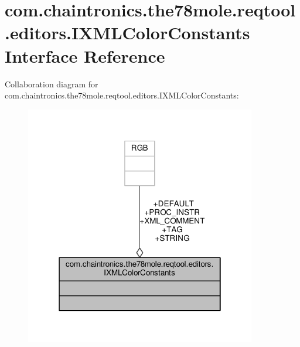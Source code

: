 \hypertarget{interfacecom_1_1chaintronics_1_1the78mole_1_1reqtool_1_1editors_1_1IXMLColorConstants}{}\section{com.\+chaintronics.\+the78mole.\+reqtool.\+editors.\+I\+X\+M\+L\+Color\+Constants Interface Reference}
\label{interfacecom_1_1chaintronics_1_1the78mole_1_1reqtool_1_1editors_1_1IXMLColorConstants}


Collaboration diagram for com.\+chaintronics.\+the78mole.\+reqtool.\+editors.\+I\+X\+M\+L\+Color\+Constants\+:\nopagebreak
\begin{figure}[H]
\begin{center}
\leavevmode
\includegraphics[width=286pt]{d3/d96/interfacecom_1_1chaintronics_1_1the78mole_1_1reqtool_1_1editors_1_1IXMLColorConstants__coll__graph}
\end{center}
\end{figure}
